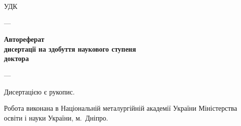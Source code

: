 \documentclass[a4paper,13pt]{atuaref}
\author{\dissauthorFullAref}
\title{\booknameUa}
\date{\bookyear}
\begin{document}
\sloppy

\thispagestyle{empty}
\begin{center}

\textbf{\belongAref}

\vspace{1ex}

\textbf{\institutionAref}

\vspace{3ex}

\textbf{\dissauthorFullAref}

\end{center}

\vspace{3ex}

\begin{flushright}
УДК \UDC
\end{flushright}

\vfill

\begin{center}
\textbf{\Large
\booknameUa
}

\vfill

\dissSpecId --- \dissSpecAref

\vfill

\textbf{Автореферат} \\
\textbf{дисертації на здобуття наукового ступеня }\\
\textbf{доктора \dissScopeAref }


\vfill

\cityAref --- \bookyear

\end{center}

\clearpage

\thispagestyle{empty}

\noindent
Дисертацією є рукопис.

\vspace{1ex plus 2ex}

\noindent
Робота виконана в Національній металургійній академії України
Міністерства освіти і науки України, м.~Дніпро.


\vspace{2ex plus 2ex}
\end{document}
